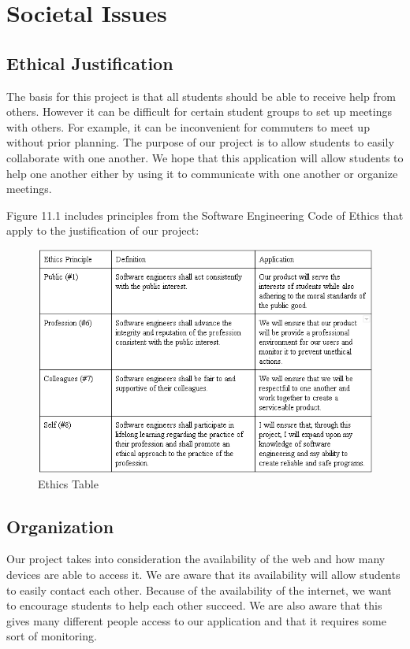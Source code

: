 \chapter{Societal Issues}

\section{Ethical Justification}
The basis for this project is that all students should be able to receive help from others. However it can be difficult for certain student groups to set up meetings with others. For example, it can be inconvenient for commuters to meet up without prior planning. The purpose of our project is to allow students to easily collaborate with one another. We hope that this application will allow students to help one another either by using it to communicate with one another or organize meetings.

Figure 11.1 includes principles from the Software Engineering Code of Ethics that apply to the justification of our project:

\begin{figure}[h]
	\centering
	\includegraphics[scale=0.75]{images/ethics_table.png}
	\caption{Ethics Table}
	\label{fig:ethics table}
\end{figure}

\section{Organization}
Our project takes into consideration the availability of the web and how many devices are able to access it. We are aware that its availability will allow students to easily contact each other. Because of the availability of the internet, we want to encourage students to help each other succeed. We are also aware that this gives many different people access to our application and that it requires some sort of monitoring. 

